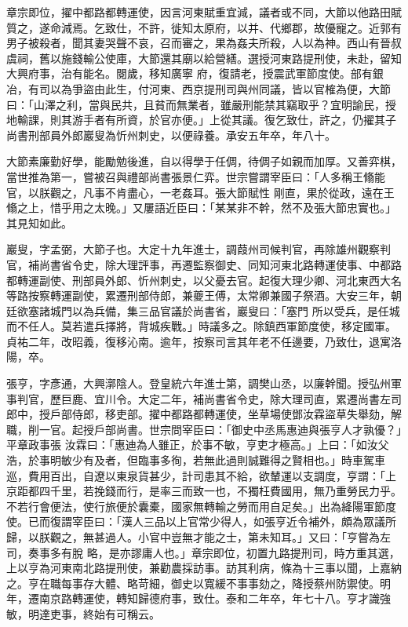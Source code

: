 \begin{pinyinscope}
 章宗即位，擢中都路都轉運使，因言河東賦重宜減，議者或不同，大節以他路田賦質之，遂命減焉。乞致仕，不許，徙知太原府，以并、代鄉郡，故優寵之。近郭有男子被殺者，聞其妻哭聲不哀，召而審之，果為姦夫所殺，人以為神。西山有晉叔虞祠，舊以施錢輸公使庫，大節還其廟以給營繕。選授河東路提刑使，未赴，留知大興府事，治有能名。閱歲，移知廣寧
 府，復請老，授震武軍節度使。部有銀冶，有司以為爭盜由此生，付河東、西京提刑司與州同議，皆以官榷為便，大節曰：「山澤之利，當與民共，且貧而無業者，雖嚴刑能禁其竊取乎？宜明諭民，授地輸課，則其游手者有所資，於官亦便。」上從其議。復乞致仕，許之，仍擢其子尚書刑部員外郎巖叟為忻州刺史，以便祿養。承安五年卒，年八十。



 大節素廉勤好學，能勵勉後進，自以得學于任倜，待倜子如親而加厚。又善弈棋，當世推為第一，嘗被召與禮部尚書張景仁弈。世宗嘗謂宰臣曰：「人多稱王翛能官，以朕觀之，凡事不肯盡心，一老姦耳。張大節賦性
 剛直，果於從政，遠在王翛之上，惜乎用之太晚。」又屢語近臣曰：「某某非不幹，然不及張大節忠實也。」其見知如此。



 巖叟，字孟弼，大節子也。大定十九年進士，調葭州司候判官，再除雄州觀察判官，補尚書省令史，除大理評事，再遷監察御史、同知河東北路轉運使事、中都路都轉運副使、刑部員外郎、忻州刺史，以父憂去官。起復大理少卿、河北東西大名等路按察轉運副使，累遷刑部侍郎，兼夔王傅，太常卿兼國子祭酒。大安三年，朝廷欲塞諸城門以為兵備，集三品官議於尚書省，巖叟曰：「塞門
 所以受兵，是任城而不任人。莫若遣兵擇將，背城疾戰。」時議多之。除鎮西軍節度使，移定國軍。貞祐二年，改昭義，復移沁南。逾年，按察司言其年老不任邊要，乃致仕，退寓洛陽，卒。



 張亨，字彥通，大興漷陰人。登皇統六年進士第，調樊山丞，以廉幹聞。授弘州軍事判官，歷巨鹿、宜川令。大定二年，補尚書省令史，除大理司直，累遷尚書左司郎中，授戶部侍郎，移吏部。擢中都路都轉運使，坐草場使鄧汝霖盜草失舉劾，解職，削一官。起授戶部尚書。世宗問宰臣曰：「御史中丞馬惠迪與張亨人才孰優？」平章政事張
 汝霖曰：「惠迪為人雖正，於事不敏，亨吏才極高。」上曰：「如汝父浩，於事明敏少有及者，但臨事多徇，若無此過則誠難得之賢相也。」時車駕車巡，費用百出，自遼以東泉貨甚少，計司患其不給，欲輦運以支調度，亨謂：「上京距都四千里，若挽錢而行，是率三而致一也，不獨枉費國用，無乃重勞民力乎。不若行會便法，使行旅便於囊橐，國家無轉輸之勞而用自足矣。」出為絳陽軍節度使。已而復謂宰臣曰：「漢人三品以上官常少得人，如張亨近令補外，頗為眾議所歸，以朕觀之，無甚過人。小官中豈無才能之士，第未知耳。」又曰：「亨嘗為左司，奏事多有脫
 略，是亦謬庸人也。」章宗即位，初置九路提刑司，時方重其選，上以亨為河東南北路提刑使，兼勸農採訪事。訪其利病，條為十三事以聞，上嘉納之。亨在職每事存大體、略苛細，御史以寬緩不事事劾之，降授蔡州防禦使。明年，遷南京路轉運使，轉知歸德府事，致仕。泰和二年卒，年七十八。亨才識強敏，明達吏事，終始有可稱云。




\end{pinyinscope}
